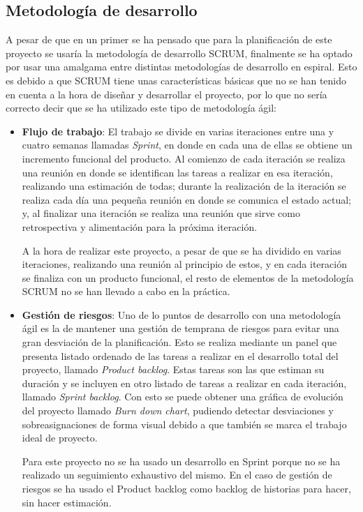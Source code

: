 \subsection{Metodología de desarrollo}
\label{subsec:metodologia}

A pesar de que en un primer se ha pensado que para la planificación de este proyecto se usaría la metodología de desarrollo SCRUM\cite{Schwaber:2001:ASD:559553}\cite{Schwaber:2004:APM:984028}, finalmente se ha optado por usar una amalgama entre distintas metodologías de desarrollo en espiral. Esto es debido a que SCRUM tiene unas características básicas que no se han tenido en cuenta a la hora de diseñar y desarrollar el proyecto, por lo que no sería correcto decir que se ha utilizado este tipo de metodología ágil:

\begin{itemize}
	\item \textbf{Flujo de trabajo}: El trabajo se divide en varias iteraciones entre una y cuatro semanas llamadas \textit{Sprint}, en donde en cada una de ellas se obtiene un incremento funcional del producto. Al comienzo de cada iteración se realiza una reunión en donde se identifican las tareas a realizar en esa iteración, realizando una estimación de todas; durante la realización de la iteración se realiza cada día una pequeña reunión en donde se comunica el estado actual; y, al finalizar una iteración se realiza una reunión que sirve como retrospectiva y alimentación para la próxima iteración.
	
	A la hora de realizar este proyecto, a pesar de que se ha dividido en varias iteraciones, realizando una reunión al principio de estos, y en cada iteración se finaliza con un producto funcional, el resto de elementos de la metodología SCRUM no se han llevado a cabo en la práctica.
	
	\item \textbf{Gestión de riesgos}: Uno de lo puntos de desarrollo con una metodología ágil es la de mantener una gestión de temprana de riesgos para evitar una gran desviación de la planificación. Esto se realiza mediante un panel que presenta listado ordenado de las tareas a realizar en el desarrollo total del proyecto, llamado \textit{Product backlog}. Estas tareas son las que estiman su duración y se incluyen en otro listado de tareas a realizar en cada iteración, llamado \textit{Sprint backlog}. Con esto se puede obtener una gráfica de evolución del proyecto llamado \textit{Burn down chart}, pudiendo detectar desviaciones y sobreasignaciones de forma visual debido a que también se marca el trabajo ideal de proyecto.
	
	Para este proyecto no se ha usado un desarrollo en Sprint porque no se ha realizado un seguimiento exhaustivo del mismo. En el caso de gestión de riesgos se ha usado el Product backlog como backlog de historias para hacer, sin hacer estimación.
\end{itemize}


